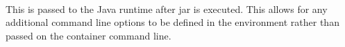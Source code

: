
\noindent\\This is passed to the Java runtime after \cxflow jar is executed.  This allows for any additional
command line options to be defined in the environment rather than passed on the \cxflowplusplus container
command line.
